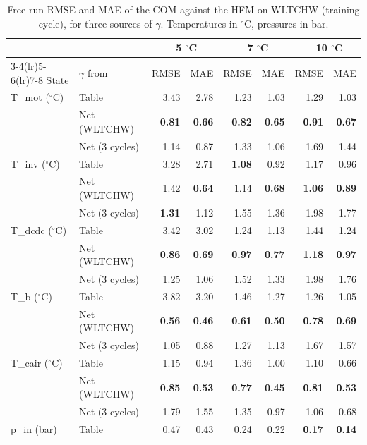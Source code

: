 \begin{table}[t]
\centering
\caption{Free-run RMSE and MAE of the COM against the HFM on WLTCHW (training cycle), for three sources of $\gamma$. Temperatures in $^\circ$C, pressures in bar.}
\label{tab:freerun_wltchw}
\small
\begin{tabular}{llrrrrrr}
\toprule
 & & \multicolumn{2}{c}{$-$5 $^\circ$C} & \multicolumn{2}{c}{$-$7 $^\circ$C} & \multicolumn{2}{c}{$-$10 $^\circ$C} \\
\cmidrule(lr){3-4}\cmidrule(lr){5-6}\cmidrule(lr){7-8}
State & $\gamma$ from & RMSE & MAE & RMSE & MAE & RMSE & MAE \\
\midrule
T\_mot ($^\circ$C) & Table & 3.43 & 2.78 & 1.23 & 1.03 & 1.29 & 1.03 \\
 & Net (WLTCHW) & \textbf{0.81} & \textbf{0.66} & \textbf{0.82} & \textbf{0.65} & \textbf{0.91} & \textbf{0.67} \\
 & Net (3 cycles) & 1.14 & 0.87 & 1.33 & 1.06 & 1.69 & 1.44 \\
\addlinespace
T\_inv ($^\circ$C) & Table & 3.28 & 2.71 & \textbf{1.08} & 0.92 & 1.17 & 0.96 \\
 & Net (WLTCHW) & 1.42 & \textbf{0.64} & 1.14 & \textbf{0.68} & \textbf{1.06} & \textbf{0.89} \\
 & Net (3 cycles) & \textbf{1.31} & 1.12 & 1.55 & 1.36 & 1.98 & 1.77 \\
\addlinespace
T\_dcdc ($^\circ$C) & Table & 3.42 & 3.02 & 1.24 & 1.13 & 1.44 & 1.24 \\
 & Net (WLTCHW) & \textbf{0.86} & \textbf{0.69} & \textbf{0.97} & \textbf{0.77} & \textbf{1.18} & \textbf{0.97} \\
 & Net (3 cycles) & 1.25 & 1.06 & 1.52 & 1.33 & 1.98 & 1.76 \\
\addlinespace
T\_b ($^\circ$C) & Table & 3.82 & 3.20 & 1.46 & 1.27 & 1.26 & 1.05 \\
 & Net (WLTCHW) & \textbf{0.56} & \textbf{0.46} & \textbf{0.61} & \textbf{0.50} & \textbf{0.78} & \textbf{0.69} \\
 & Net (3 cycles) & 1.05 & 0.88 & 1.27 & 1.13 & 1.67 & 1.57 \\
\addlinespace
T\_cair ($^\circ$C) & Table & 1.15 & 0.94 & 1.36 & 1.00 & 1.10 & 0.66 \\
 & Net (WLTCHW) & \textbf{0.85} & \textbf{0.53} & \textbf{0.77} & \textbf{0.45} & \textbf{0.81} & \textbf{0.53} \\
 & Net (3 cycles) & 1.79 & 1.55 & 1.35 & 0.97 & 1.06 & 0.68 \\
\addlinespace
p\_in (bar) & Table & 0.47 & 0.43 & 0.24 & 0.22 & \textbf{0.17} & \textbf{0.14} \\

\end{tabular}
\end{table}
